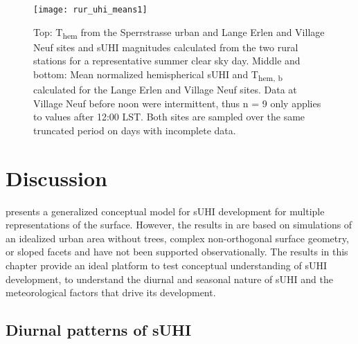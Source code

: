\begin{bibunit}
\begin{figure}[H]
	\centering
	\texttt{[image: rur\_uhi\_means1]}
	\caption{Top: T\textsubscript{hem} from the Sperrstrasse urban and Lange Erlen and Village Neuf sites and sUHI magnitudes calculated from the two rural stations for a representative summer clear sky day. Middle and bottom: Mean normalized hemispherical sUHI and T\textsubscript{hem, b} calculated for the Lange Erlen and Village Neuf sites. Data at Village Neuf before noon were intermittent, thus n = 9 only applies to values after 12:00 LST. Both sites are sampled over the same truncated period on days with incomplete data.}
	\label{rur_uhi_means}
\end{figure}

\section{Discussion}
\citet{Oke2017} presents a generalized conceptual model for sUHI development for multiple representations of the surface. However, the results in \citet{Oke2017} are based on simulations of an idealized urban area without trees, complex non-orthogonal surface geometry, or sloped facets and have not been supported observationally. The results in this chapter provide an ideal platform to test conceptual understanding of sUHI development, to understand the diurnal and seasonal nature of sUHI and the meteorological factors that drive its development.

\subsection{Diurnal patterns of sUHI}
\label{gen}


\end{bibunit}
